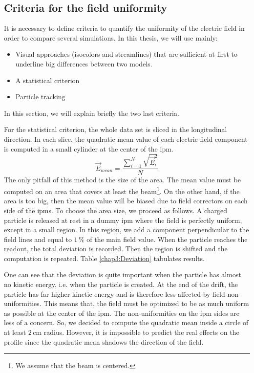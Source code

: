 \begin{refsection}
  \subsection{Criteria for the field uniformity}
  \label{chap3:sec:criteria}
  It is necessary to define criteria to quantify the uniformity of the electric field in order to compare several simulations. In this thesis, we will use mainly:
  \begin{itemize}
    \item Visual approaches (isocolors and streamlines) that are sufficient at first to underline big differences between two models.
    \item A statistical criterion
    \item Particle tracking
  \end{itemize}
  In this section, we will explain briefly the two last criteria.

  For the statistical criterion, the whole data set is sliced in the longitudinal direction. In each slice, the quadratic mean value of each electric field component is computed in a small cylinder at the center of the \acrshort{ipm}.
  \begin{equation}
    \vec{E}_{mean} = \frac{\sum_{i=1}^{N}\sqrt{\vec{E}_{i}^{2}}}{N}
  \end{equation}
  The only pitfall of this method is the size of the area. The mean value must be computed on an area that covers at least the beam\footnote{We assume that the beam is centered.}. On the other hand, if the area is too big, then the mean value will be biased due to field correctors on each side of the \acrshort{ipm}s.
  To choose the area size, we proceed as follows. A charged particle is released at rest in a dummy \acrshort{ipm} where the field is perfectly uniform, except in a small region. In this region, we add a component perpendicular to the field lines and equal to $1\,\mathrm{\%}$ of the main field value. When the particle reaches the readout, the total deviation is recorded. Then the region is shifted and the computation is repeated. Table \ref{chap3:Deviation} tabulates results.

  

  One can see that the deviation is quite important when the particle has almost no kinetic energy, i.e. when the particle is created.
  At the end of the drift, the particle has far higher kinetic energy and is therefore less affected by field non-uniformities. This means that, the field must be optimized to be as much uniform as possible at the center of the \acrshort{ipm}. The non-uniformities on the \acrshort{ipm} sides are less of a concern.
  So, we decided to compute the quadratic mean inside a circle of at least $2\,\mathrm{cm}$ radius. However, it is impossible to predict the real effects on the profile since the quadratic mean shadows the direction of the field.


\end{refsection}

